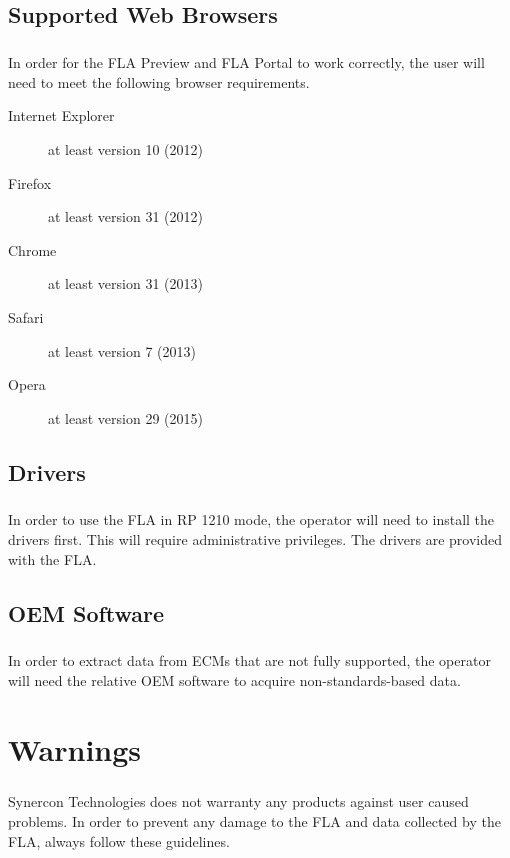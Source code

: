 \documentclass[11pt, oneside]{book}
\begin{document}
\label{sec:supported_browsers}
\section{Supported Web Browsers}
\paragraph{  }
In order for the FLA Preview and FLA Portal to work correctly, the
user will need to meet the following browser requirements.

\begin{description}
\item [{Internet Explorer}] at least version 10 (2012)
\item [{Firefox}] at least version 31 (2012)
\item [{Chrome}] at least version 31 (2013)
\item [{Safari}] at least version 7 (2013)
\item [{Opera}] at least version 29 (2015)
\end{description}

\section{Drivers}
\paragraph{  }
In order to use the FLA in RP 1210 mode, the operator will need to
install the drivers first. This will require administrative privileges.
The drivers are provided with the FLA.


\section{OEM Software}
\paragraph{  }
In order to extract data from ECMs that are not fully supported, the
operator will need the relative OEM software to acquire non-standards-based
data.


\chapter{Warnings}
\paragraph{  }
Synercon Technologies does not warranty any products against user
caused problems. In order to prevent any damage to the FLA and data
collected by the FLA, always follow these guidelines.
\end{document}
